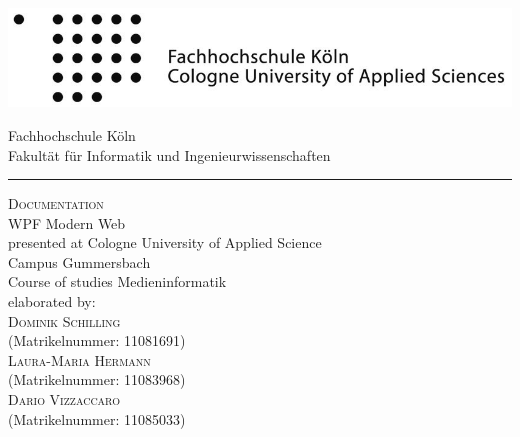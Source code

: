 \documentclass[a4paper,12pt,oneside]{article} %
\begin{document}

  \pagestyle{empty}
  

  \begin{titlepage}
    \includegraphics[scale=1.00]{Sources/logo_fhkoeln_sw}\\
    \begin{center}
      \Large
      Fachhochschule Köln\\
      Fakultät für Informatik und Ingenieurwissenschaften\\
      \hrule\par\rule{0pt}{2cm} %
      \LARGE
      \textsc{Documentation}\\
      \vspace{1cm} %
      \huge
      WPF Modern Web\\
      \Large
      \vspace{1.5cm}
      \large
      presented at Cologne University of Applied Science\\
      Campus Gummersbach\\
      Course of studies
      Medieninformatik\\
      \vspace{1.0cm}
      elaborated by:\\
      \textsc{Dominik Schilling}\\
      (Matrikelnummer: 11081691)\\
      \textsc{Laura-Maria Hermann}\\
      (Matrikelnummer: 11083968)\\
      \textsc{Dario Vizzaccaro}\\
      (Matrikelnummer: 11085033)\\
      \vspace{1.5cm}
      \vspace{1.5cm}

    \end{center}
  \end{titlepage}

  \newpage


  \tableofcontents
	\pagestyle{fancy}
\end{document}
